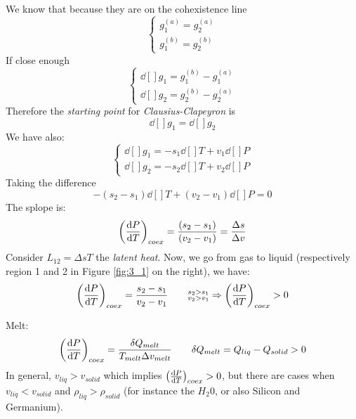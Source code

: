 \documentclass[../main/main.tex]{subfiles}
\begin{document}
We know that because they are on the cohexistence line
\begin{equation}
  \begin{cases}
   g_1^{(a)} = g_2^{(a)}\\
   g_1^{(b)} = g_2^{(b)}
  \end{cases}
\label{eq:}
\end{equation}
If close enough
\begin{equation}
  \begin{cases}
  \dd[]{g_1} = g_1^{(b)} - g_1^{(a)} \\
  \dd[]{g_2} = g_2^{(b)} - g_2^{(a)}
  \end{cases}
\label{eq:}
\end{equation}
Therefore the \emph{starting point} for \emph{Clausius-Clapeyron} is
\begin{equation}
  \dd[]{g_1} =\dd[]{g_2}
  \label{eq:}
\end{equation}
We have also:
\begin{equation}
  \begin{cases}
   \dd[]{g_1} = -s_1 \dd[]{T} + v_1 \dd[]{P}   \\
   \dd[]{g_2} = -s_2 \dd[]{T} + v_2 \dd[]{P}
  \end{cases}
\label{eq:}
\end{equation}
Taking the difference
\begin{equation}
  -(s_2 - s_1) \dd[]{T} + (v_2 - v_1) \dd[]{P} = 0
  \label{eq:}
\end{equation}
The splope is:
\begin{equation}
  \qty(\dv{P}{T} )_{coex} = \frac{(s_2-s_1)}{(v_2-v_1)} = \frac{\Delta s}{\Delta v}
  \label{eq:}
\end{equation}
Consider \( L_{12} = \Delta s T \) the \emph{latent heat}.
Now, we go from gas to liquid (respectively region 1 and 2 in Figure \ref{fig:3_1} on the right), we have:
\begin{equation}
  \qty(\dv{P}{T} )_{coex} = \frac{s_2 - s_1}{v_2 - v_1} \qquad \substack{ s_2 > s_1 \\ v_2 > v_1} \Rightarrow \qty(\dv{P}{T} )_{coex} > 0
  \label{eq:}
\end{equation}

Melt:
\begin{equation}
  \qty(\dv{P}{T} )_{coex} = \frac{\delta Q_{melt}}{T_{melt}\Delta v_{melt}} \qquad \delta Q_{melt} = Q_{liq} - Q_{solid} > 0
  \label{eq:}
\end{equation}
In general, \( v_{liq} > v_{solid} \) which implies \( \qty(\dv{P}{T} )_{coex} > 0  \), but there are cases when \( v_{liq} < v_{solid} \) and \( \rho_{liq} > \rho _{solid} \) (for instance the \( H_2 0 \), or also Silicon and Germanium).
\end{document}
